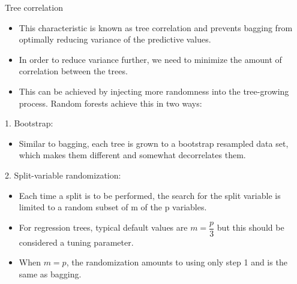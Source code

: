 \documentclass[10pt,ignorenonframetext,]{beamer}
\providecommand{\tightlist}{%
  \setlength{\itemsep}{0pt}\setlength{\parskip}{0pt}}
\begin{document}
\begin{frame}{Tree correlation}

\begin{itemize}
\tightlist
\item
  This characteristic is known as tree correlation and prevents bagging
  from optimally reducing variance of the predictive values.
\item
  In order to reduce variance further, we need to minimize the amount of
  correlation between the trees.
\item
  This can be achieved by injecting more randomness into the
  tree-growing process. Random forests achieve this in two ways:
\end{itemize}

\begin{block}{1. Bootstrap:}

\begin{itemize}
\tightlist
\item
  Similar to bagging, each tree is grown to a bootstrap resampled data
  set, which makes them different and somewhat decorrelates them.
\end{itemize}

\end{block}

\begin{block}{2. Split-variable randomization:}

\begin{itemize}
\tightlist
\item
  Each time a split is to be performed, the search for the split
  variable is limited to a random subset of m of the p variables.
\item
  For regression trees, typical default values are \(m=\dfrac{p}{3}\)
  but this should be considered a tuning parameter.
\item
  When \(m=p\), the randomization amounts to using only step 1 and is
  the same as bagging.
\end{itemize}

\end{block}

\end{frame}
\end{document}

